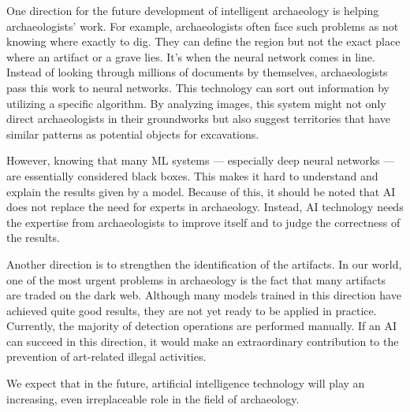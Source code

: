\documentclass[journal]{IEEEtran}
\begin{document}
	One direction for the future development of intelligent archaeology is helping archaeologists' work.
	For example, archaeologists often face such problems as not knowing where exactly to dig. 
	They can define the region but not the exact place where an artifact or a grave lies. 
	It's when the neural network comes in line. Instead of looking through millions of documents by themselves, 
	archaeologists pass this work to neural networks. This technology can sort out information by utilizing a 
	specific algorithm. By analyzing images, this system might not only direct archaeologists in their 
	groundworks but also suggest territories that have similar patterns as potential objects for excavations.

	However, knowing that many ML systems --- especially deep neural networks --- are essentially considered black boxes.
	This makes it hard to understand and explain the results given by a model. Because of this, it should be noted that AI does not 
	replace the need for experts in archaeology. Instead, AI technology needs the expertise from archaeologists to improve itself and 
	to judge the correctness of the results.

	Another direction is to strengthen the identification of the artifacts.
	In our world, one of the most urgent problems in archaeology is the fact that
	many artifacts are traded on the dark web. Although 
	many models trained in this direction have achieved 
	quite good results, they are not yet ready to be 
	applied in practice. Currently, the majority of 
	detection operations are performed manually.
	If an AI can succeed in this direction, it would 
	make an extraordinary contribution to the prevention of 
	art-related illegal activities.

	We expect that in the future, artificial intelligence technology will play an increasing, even irreplaceable role in the field of archaeology.
	
	
\end{document}
